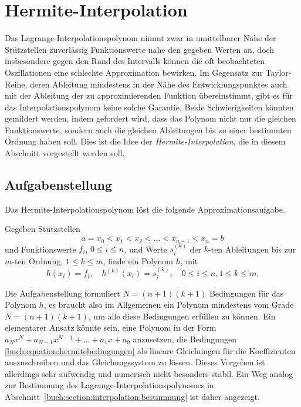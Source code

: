 %
%
%
\section{Hermite-Interpolation
\label{buch:section:hermite}}
Das Lagrange-Interpolationspolynom nimmt zwar in umittelbarer Nähe der 
Stützstellen zuverlässig Funktionswerte nahe den gegeben Werten an,
doch insbesondere gegen den Rand des Intervalls können die oft beobachteten
Oszillationen eine schlechte Approximation bewirken.
%
%
%
Im Gegensatz zur Taylor-Reihe, deren Ableitung mindestens in der Nähe des
Entwicklungspunktes auch mit der Ableitung der zu approximierenden
Funktion übereinstimmt, gibt es für das Interpolationspolynom keine
solche Garantie.
%
Beide Schwierigkeiten könnten gemildert werden, indem gefordert wird,
dass das Polynom nicht nur die gleichen Funktionswerte, sondern auch
die gleichen Ableitungen bis zu einer bestimmten Ordnung haben soll.
Dies ist die Idee der {\em Hermite-Interpolation},
%
die in diesem Abschnitt vorgestellt werden soll.

%
%
\subsection{Aufgabenstellung
\label{b8ch:subsection:hermite:aufgabe}}
Das Hermite-Interpolationspolynom löst die folgende Approximationsaufgabe.

\begin{aufgabe}
%
%
Gegeben Stützstellen
\[
a=x_0<x_1<x_2<\dots < x_{n-1}<x_n=b
\]
und Funktionswerte $f_i$, $0\le i\le n$, und Werte
$s_i^{(k)}$ der $k$-ten Ableitungen bis zur $m$-ten Ordnung, $1\le k\le m$,
finde ein Polynom $h$, mit
\begin{equation}
h(x_i) = f_i,\quad h^{(k)}(x_i)=s_i^{(k)},\quad 0\le i \le n, 1\le k\le m.
\label{buch:equation:hermitebedingungen}
\end{equation}
\end{aufgabe}
Die Aufgabenstellung formuliert $N=(n+1)(k+1)$ Bedingungen für das Polynom $h$,
es braucht also im Allgemeinen ein Polynom mindestens vom Grade $N=(n+1)(k+1)$,
um alle diese Bedingungen erfüllen zu können.
Ein elementarer Ansatz könnte sein, eine Polynom in der Form
$a_Nx^N+a_{N-1}x^{N-1}+\dots+a_1x+a_0$ anzusetzen, die Bedingungen
\eqref{buch:equation:hermitebedingungen} als lineare Gleichungen für
die Koeffizienten auszuschreiben und das Gleichungssystem zu lössen.
Dieses Vorgehen ist allerdings sehr aufwendig und numerisch nicht besonders
stabil.
Ein Weg analog zur Bestimmung des Lagrange-Interpolationspolynomes in
Abschnitt~\ref{buch:section:interpolation:bestimmung}
ist daher angezeigt.

